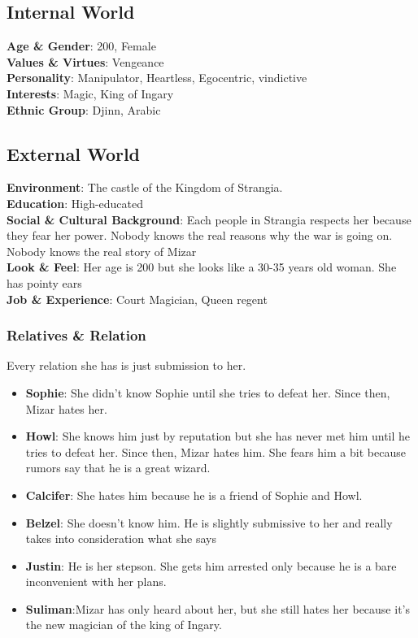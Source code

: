 \subsection{Internal World}

\textbf{Age \& Gender}: 200, Female \\
\textbf{Values \& Virtues}: Vengeance \\
\textbf{Personality}: Manipulator, Heartless, Egocentric, vindictive \\
\textbf{Interests}: Magic, King of Ingary \\
\textbf{Ethnic Group}: Djinn, Arabic

\subsection{External World}
\textbf{Environment}: The castle of the Kingdom of Strangia. \\
\textbf{Education}: High-educated \\
\textbf{Social \& Cultural Background}: Each people in Strangia respects her because they fear her power. Nobody knows the real reasons why the war is going on. Nobody knows the real story of Mizar \\
\textbf{Look \& Feel}: Her age is 200 but she looks like a 30-35 years old woman. She has pointy ears  \\
\textbf{Job \& Experience}: Court Magician, Queen regent \\

\subsubsection*{Relatives \& Relation}
Every relation she has is just submission to her.
\begin{itemize}
\item \textbf{Sophie}: She didn’t know Sophie until she tries to defeat her. Since then, Mizar hates her.
\item \textbf{Howl}: She knows him just by reputation but she has never met him until he tries to defeat her. Since then, Mizar hates him. She fears him a bit because rumors say that he is a great wizard.
\item \textbf{Calcifer}: She hates him because he is a friend of Sophie and Howl.
\item \textbf{Belzel}: She doesn’t know him. He is slightly submissive to her and really takes into consideration what she says
\item \textbf{Justin}: He is her stepson. She gets him arrested only because he is a bare  inconvenient with her plans. 
\item \textbf{Suliman}:Mizar has only heard about her, but she still hates her because it’s the new magician of the king of Ingary.
\end{itemize}

